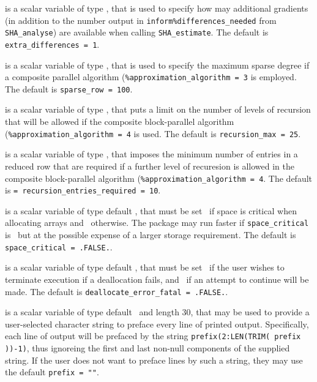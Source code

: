 \documentclass{galahad}
\newcommand{\packagename}{SHA}
\begin{document}
\begin{description}
 is a scalar variable of type \integer,
that is used to specify how may additional gradients (in addition to the number
output in {\tt inform\%differences\_needed} from {\tt \packagename\_\-analyse})
are available when calling {\tt \packagename\_\-estimate}.
The default is {\tt extra\_differences = 1}.

 is a scalar variable of type \integer,
that is used to specify the maximum sparse degree if a composite
parallel algorithm ({\tt \%approximation\_algorithm = 3} is employed.
The default is {\tt sparse\_row = 100}.

 is a scalar variable of type \integer, that puts a limit
on the number of levels of recursion that will be allowed if the
composite block-parallel algorithm ({\tt \%approximation\_algorithm = 4} is
used.
The default is {\tt recursion\_max  = 25}.

 is a scalar variable of type \integer,
that imposes the minimum number of entries in a reduced row that are required
if a further level of recuresion is allowed in the composite block-parallel
algorithm ({\tt \%approximation\_algorithm = 4}.
The default is {\tt  = recursion\_entries\_required = 10}.

 is a scalar variable of type default \logical,
that must be set \true\ if space is critical when allocating arrays
and  \false\ otherwise. The package may run faster if
{\tt space\_critical} is \false\ but at the possible expense of a larger
storage requirement. The default is {\tt space\_critical = .FALSE.}.

 is a scalar variable of type default \logical,
that must be set \true\ if the user wishes to terminate execution if
a deallocation  fails, and \false\ if an attempt to continue
will be made. The default is {\tt deallocate\_error\_fatal = .FALSE.}.

 is a scalar variable of type default \character\
and length 30, that may be used to provide a user-selected
character string to preface every line of printed output.
Specifically, each line of output will be prefaced by the string
{\tt prefix(2:LEN(TRIM( prefix ))-1)},
thus ignoreing the first and last non-null components of the
supplied string. If the user does not want to preface lines by such
a string, they may use the default {\tt prefix = ""}.

\end{description}
\end{document}
